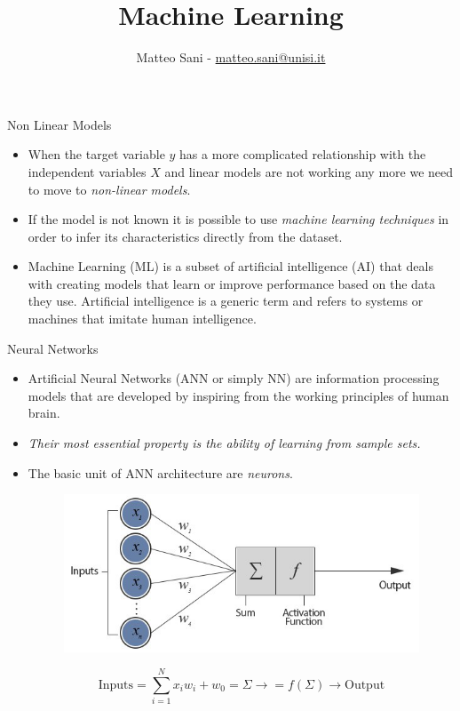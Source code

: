 \documentclass{beamer}
\title{Machine Learning}
\author{Matteo Sani - \href{mailto:matteo.sani@unisi.it}{matteo.sani@unisi.it}}
\begin{document}
\begin{frame}[plain]
	\maketitle
\end{frame}

\begin{frame}{Non Linear Models}
  \begin{itemize}
    \item When the target variable $y$ has a more complicated relationship with the independent variables $X$ and linear models are not working any more we need to move to \emph{non-linear models}.
    \item If the model is not known it is possible to use \emph{machine learning techniques} in order to infer its characteristics directly from the dataset.
    \item Machine Learning (ML) is a subset of artificial intelligence (AI) that deals with creating models that learn or improve performance based on the data they use. Artificial intelligence is a generic term and refers to systems or machines that imitate human intelligence.
  \end{itemize}
\end{frame}

\begin{frame}{Neural Networks}
  \begin{itemize}
  \item Artificial Neural Networks (ANN or simply NN) are information processing models that are developed by inspiring from the working principles of human brain.
  \item \emph{Their most essential property is the ability of learning from sample sets.}
  \item The basic unit of ANN architecture are \emph{neurons}. 
    \begin{figure}[htb]
      \begin{center}
        \includegraphics[width=0.55\linewidth]{neuron}
      \end{center}
    \end{figure}
    \begin{equation}  
      \textrm{Inputs} = \sum_{i=1}^{N} x_i w_i +w_0 = \Sigma \rightarrow = f(\Sigma) \rightarrow \textrm{Output}
    \end{equation}
  \end{itemize}
\end{frame}
\end{document}
